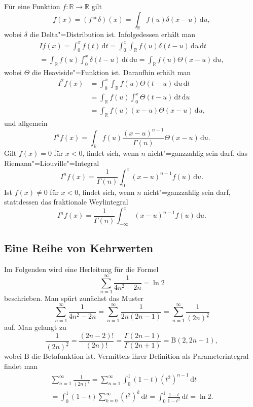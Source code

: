 \documentclass[a4paper,10pt,fleqn,twocolumn,twoside,dvipdfmx]{scrartcl}
\numberwithin{equation}{section}
\newcommand{\R}{\mathbb R}
\theoremstyle{rmbox}
\begin{document}
Für eine Funktion $f\colon\R\to\R$ gilt
\[f(x) = (f*\delta)(x) = \int_\R f(u)\delta(x-u)\,\mathrm du,\]
wobei $\delta$ die Delta"=Distribution ist. Infolgedessen erhält man%
\begin{gather*}
If(x) = \int_0^x f(t)\,\mathrm dt =
\int_0^x \int_\R f(u)\delta(t-u)\,\mathrm du\,\mathrm dt\\
= \int_\R f(u)\int_0^x \delta(t-u)\,\mathrm dt\,\mathrm du
= \int_\R f(u)\Theta(x-u)\,\mathrm du,
\end{gather*}
wobei $\Theta$ die Heaviside"=Funktion ist. Daraufhin erhält man%
\begin{align*}
I^2 f(x) &= \int_0^x \int_\R f(u)\Theta(t-u)\,\mathrm du\,\mathrm dt\\
&= \int_\R f(u)\int_0^x\Theta(t-u)\,\mathrm dt\,\mathrm du\\
&= \int_\R f(u)(x-u)\Theta(x-u)\,\mathrm du,
\end{align*}
und allgemein
\[I^n f(x) = \int_\R f(u)\frac{(x-u)^{n-1}}{\Gamma(n)}\Theta(x-u)\,\mathrm du.\]
Gilt $f(x)=0$ für $x<0$, findet sich, wenn $n$ nicht"=ganzzahlig sein darf,
das Riemann"=Liouville"=Integral%
\[I^n f(x) = \frac{1}{\Gamma(n)}\int_0^x (x-u)^{n-1}f(u)\,\mathrm du.\]
Ist $f(x)\ne 0$ für $x<0$, findet sich, wenn $n$ nicht"=ganzzahlig sein
darf, stattdessen das fraktionale Weylintegral%
\[I^n f(x) = \frac{1}{\Gamma(n)}\int_{-\infty}^x (x-u)^{n-1}f(u)\,\mathrm du.\]

\subsection{Eine Reihe von Kehrwerten}

Im Folgenden wird eine Herleitung für die Formel
\begin{equation}
\sum_{n=1}^\infty \frac{1}{4n^2-2n} = \ln 2
\end{equation}
beschrieben. Man spürt zunächst das Muster
\[\sum_{n=1}^\infty \frac{1}{4n^2-2n} =
\sum_{n=1}^\infty \frac{1}{2n(2n-1)} = \sum_{n=1}^\infty \frac{1}{(2n)^{\underline 2}}\]
auf. Man gelangt zu
\[\frac{1}{(2n)^{\underline 2}} = \frac{(2n-2)!}{(2n)!}
= \frac{\Gamma(2n-1)}{\Gamma(2n+1)} = \mathrm B(2,2n-1),\]
wobei $\mathrm B$ die Betafunktion ist. Vermittels ihrer Definition
als Parameterintegral findet man
\begin{gather*}
\sum_{n=1}^\infty \frac{1}{(2n)^{\underline 2}}
= \sum_{n=1}^\infty\int_0^1 (1-t)(t^2)^{n-1}\,\mathrm dt\\
= \int_0^1 (1-t)\sum_{k=0}^\infty (t^2)^k\,\mathrm dt
= \int_0^1 \frac{1-t}{1-t^2}\,\mathrm dt = \ln 2.
\end{gather*}
\end{document}
